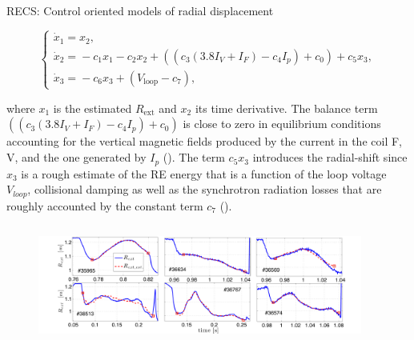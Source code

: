 \documentclass{beamer}
\begin{document}
\begin{frame}{RECS: Control oriented models of radial displacement}
    
    
    \scriptsize
    
    \begin{equation}
    \left\{
    \begin{array}{ll}
    \dot x_1= x_2,\\
    \dot x_2= \!{-}c_1x_1\!{-}c_2x_2\!{+}((c_3(3.8I_V\!{+}I_F)\!{-}c_4I_p)\!{+}c_0)\!{+}c_5x_3, 	\\
    \dot x_3 =\!\!{-}c_6x_3\!{+}(V_{\text{loop}}\!{-}c_7),
    \end{array}
    \right.
    \end{equation}
    
where $x_1$ is the estimated $R_{\text{ext}}$ and $x_2$ its time derivative.
The balance term $((c_3(3.8I_V+I_F)-c_4I_p)+c_0)$ is close to zero in equilibrium conditions accounting for the vertical magnetic fields produced by the current in the coil F, V, and the one generated by $I_p$ (\cite{Astolfi2014}). The term $c_5x_3$ introduces the radial-shift since
$x_3$ is a rough estimate of the RE energy that is a function of the loop voltage $V_{loop}$, collisional damping as well as the synchrotron radiation losses that are roughly accounted by the constant term $c_7$ (\cite{Martin-Solis2010}).
    
\begin{columns}

	\begin{column}{0.6\textwidth}
        \begin{figure}
        \vspace*{-0.8cm}
        \centering
        	\includegraphics[width=1\textwidth]{models/rs2}
        \end{figure}
    \end{column}
    
    \begin{column}{0.4\textwidth}
\begin{table}
	\tiny
	

\end{table}
\end{column}
\end{columns}
\end{frame}
\end{document}
